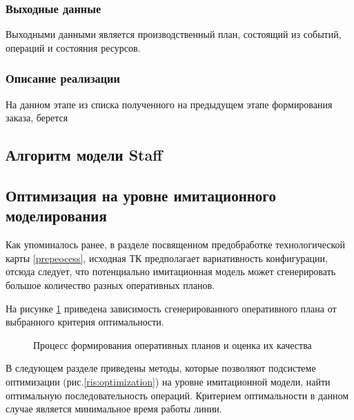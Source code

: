 \subsubsection*{Выходные данные}
Выходными данными является производственный план, состоящий из событий, операций и состояния ресурсов.

\subsubsection*{Описание реализации}
На данном этапе из списка полученного на предыдущем этапе формирования заказа, берется 

\subsection{Алгоритм модели Staff}

\subsection{Оптимизация на уровне имитационного моделирования}

Как упоминалось ранее, в разделе посвященном предобработке технологической карты \ref{prepeocess}, исходная ТК предполагает вариативность конфигурации, отсюда следует, что потенциально имитационная модель может сгенерировать большое количество разных оперативных планов.

На рисунке \ref{ris:IM_process} приведена зависимость сгенерированного оперативного плана от выбранного критерия оптимальности.




\begin{figure}[H]
    \caption{Процесс формирования оперативных планов и оценка их качества}
    \label{ris:IM_process}
\end{figure}

В следующем разделе приведены методы, которые позволяют подсистеме оптимизации (рис.\ref{ris:optimization}) на уровне имитационной модели, найти оптимальную последовательность операций. Критерием оптимальности в данном случае является минимальное время работы линии.

